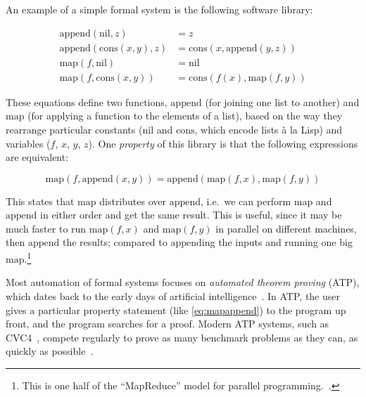 \documentclass[]{default}
\newcommand{\name}[1]{\mathrm{#1}}
\begin{document}
An example of a simple formal system is the following software
library:

\begin{equation*}
  \begin{aligned}
    \name{append}(\name{nil},        z) &= z                                   \\
    \name{append}(\name{cons}(x,y),  z) &= \name{cons}(x, \name{append}(y, z)) \\
    \name{map}(f,           \name{nil}) &= \name{nil}                          \\
    \name{map}(f,    \name{cons}(x, y)) &= \name{cons}(f(x), \name{map}(f, y))
  \end{aligned}
\end{equation*}

These equations define two functions, $\name{append}$ (for joining one list to
another) and $\name{map}$ (for applying a function to the elements of a list),
based on the way they rearrange particular constants ($\name{nil}$ and
$\name{cons}$, which encode lists à la Lisp) and variables ($f$, $x$, $y$, $z$).
One \emph{property} of this library is that the following expressions are
equivalent:

\begin{equation}\label{eq:mapappend}
  \name{map}(f, \name{append}(x, y)) =
    \name{append}(\name{map}(f, x), \name{map}(f, y))
\end{equation}

This states that $\name{map}$ distributes over $\name{append}$, i.e.\ we can
perform $\name{map}$ and $\name{append}$ in either order and get the same
result. This is useful, since it may be much faster to run $\name{map}(f, x)$
and $\name{map}(f, y)$ in parallel on different machines, then $\name{append}$
the results; compared to $\name{append}$ing the inputs and running one big
$\name{map}$.\footnote{This is one half of the ``MapReduce'' model for parallel
  programming.~\cite{dean2008mapreduce}.}

Most automation of formal systems focuses on \emph{automated theorem proving}
(ATP), which dates back to the early days of artificial
intelligence~\cite{newell1956logic}. In ATP, the user gives a particular
property statement (like \ref{eq:mapappend}) to the program up front, and the
program searches for a proof. Modern ATP systems, such as
CVC4~\cite{barrett2011cvc4}, compete regularly to prove as many benchmark
problems as they can, as quickly as possible~\cite{sutcliffe2006state}.
\end{document}
